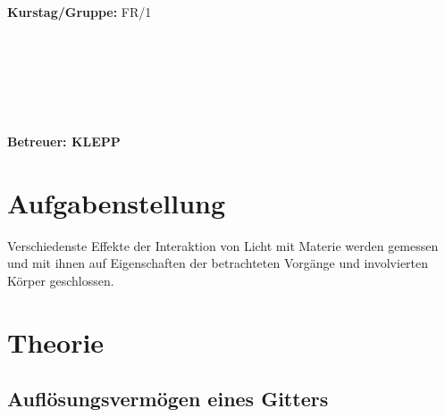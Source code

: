 \documentclass{article}
\begin{document}
\begin{verbatim}


\end{verbatim}
			\begin{flushleft}
			\textbf{\Large{Kurstag/Gruppe:}} \Large{FR/1}
			\end{flushleft}

\begin{verbatim}






\end{verbatim}
			\begin{flushleft}
			\LARGE{\textbf{Betreuer:\Large{ KLEPP }}}		
			\end{flushleft}
			
\section{Aufgabenstellung}
Verschiedenste Effekte der Interaktion von Licht mit Materie werden gemessen und mit ihnen auf Eigenschaften der betrachteten Vorgänge und involvierten Körper geschlossen.

\section{Theorie}
\subsection{Auflösungsvermögen eines Gitters}
\end{document}
